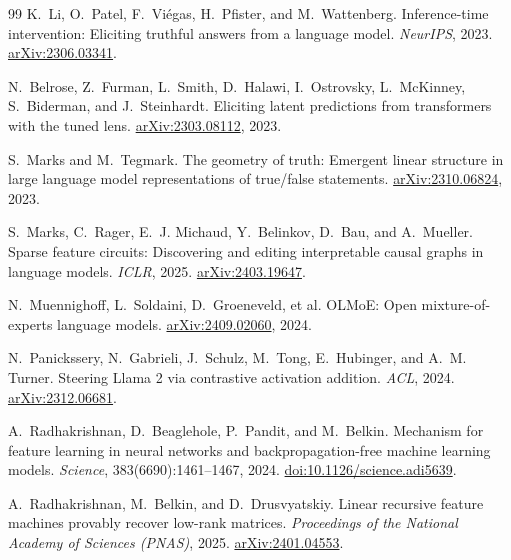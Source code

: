 \documentclass[11pt]{article}
\begin{document}
\begin{thebibliography}{99}
K.~Li, O.~Patel, F.~Vi\'egas, H.~Pfister, and M.~Wattenberg.
\newblock Inference-time intervention: Eliciting truthful answers from a language model.
\newblock \textit{NeurIPS}, 2023.
\href{https://arxiv.org/abs/2306.03341}{arXiv:2306.03341}.

N.~Belrose, Z.~Furman, L.~Smith, D.~Halawi, I.~Ostrovsky, L.~McKinney, S.~Biderman, and J.~Steinhardt.
\newblock Eliciting latent predictions from transformers with the tuned lens.
\newblock \href{https://arxiv.org/abs/2303.08112}{arXiv:2303.08112}, 2023.

S.~Marks and M.~Tegmark.
\newblock The geometry of truth: Emergent linear structure in large language model representations of true/false statements.
\newblock \href{https://arxiv.org/abs/2310.06824}{arXiv:2310.06824}, 2023.

S.~Marks, C.~Rager, E.~J. Michaud, Y.~Belinkov, D.~Bau, and A.~Mueller.
\newblock Sparse feature circuits: Discovering and editing interpretable causal graphs in language models.
\newblock \textit{ICLR}, 2025.
\href{https://arxiv.org/abs/2403.19647}{arXiv:2403.19647}.

N.~Muennighoff, L.~Soldaini, D.~Groeneveld, et al.
\newblock OLMoE: Open mixture-of-experts language models.
\newblock \href{https://arxiv.org/abs/2409.02060}{arXiv:2409.02060}, 2024.

N.~Panickssery, N.~Gabrieli, J.~Schulz, M.~Tong, E.~Hubinger, and A.~M. Turner.
\newblock Steering Llama 2 via contrastive activation addition.
\newblock \textit{ACL}, 2024.
\href{https://arxiv.org/abs/2312.06681}{arXiv:2312.06681}.

A.~Radhakrishnan, D.~Beaglehole, P.~Pandit, and M.~Belkin.
\newblock Mechanism for feature learning in neural networks and backpropagation-free machine learning models.
\newblock \textit{Science}, 383(6690):1461--1467, 2024.
\href{https://doi.org/10.1126/science.adi5639}{doi:10.1126/science.adi5639}.

A.~Radhakrishnan, M.~Belkin, and D.~Drusvyatskiy.
\newblock Linear recursive feature machines provably recover low-rank matrices.
\newblock \textit{Proceedings of the National Academy of Sciences (PNAS)}, 2025.
\href{https://arxiv.org/abs/2401.04553}{arXiv:2401.04553}.


\end{thebibliography}
\end{document}
